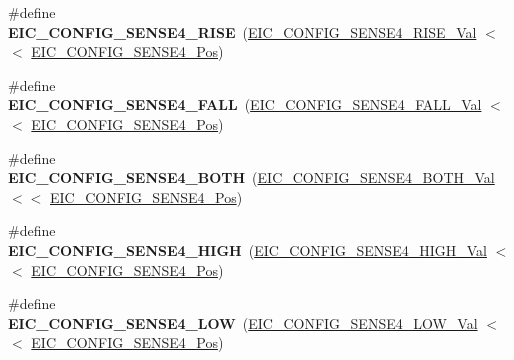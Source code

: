 \begin{DoxyCompactItemize}
\item 
\hypertarget{group___s_a_m_l21___e_i_c_ga3b5ae1a6631feb1f3dfd6a2c79d9be79}{}\#define {\bfseries E\+I\+C\+\_\+\+C\+O\+N\+F\+I\+G\+\_\+\+S\+E\+N\+S\+E4\+\_\+\+R\+I\+S\+E}~(\hyperlink{group___s_a_m_l21___e_i_c_gaad52f78c0fc34ba713282c4f2cb52965}{E\+I\+C\+\_\+\+C\+O\+N\+F\+I\+G\+\_\+\+S\+E\+N\+S\+E4\+\_\+\+R\+I\+S\+E\+\_\+\+Val}    $<$$<$ \hyperlink{group___s_a_m_l21___e_i_c_gad23c76b1fbf7d30fa3aa738a38c453c3}{E\+I\+C\+\_\+\+C\+O\+N\+F\+I\+G\+\_\+\+S\+E\+N\+S\+E4\+\_\+\+Pos})\label{group___s_a_m_l21___e_i_c_ga3b5ae1a6631feb1f3dfd6a2c79d9be79}

\item 
\hypertarget{group___s_a_m_l21___e_i_c_gaa4ecdea1d3d333051a1004aed81462de}{}\#define {\bfseries E\+I\+C\+\_\+\+C\+O\+N\+F\+I\+G\+\_\+\+S\+E\+N\+S\+E4\+\_\+\+F\+A\+L\+L}~(\hyperlink{group___s_a_m_l21___e_i_c_ga4fe8ad8e7d22ba42d070d9108213d907}{E\+I\+C\+\_\+\+C\+O\+N\+F\+I\+G\+\_\+\+S\+E\+N\+S\+E4\+\_\+\+F\+A\+L\+L\+\_\+\+Val}    $<$$<$ \hyperlink{group___s_a_m_l21___e_i_c_gad23c76b1fbf7d30fa3aa738a38c453c3}{E\+I\+C\+\_\+\+C\+O\+N\+F\+I\+G\+\_\+\+S\+E\+N\+S\+E4\+\_\+\+Pos})\label{group___s_a_m_l21___e_i_c_gaa4ecdea1d3d333051a1004aed81462de}

\item 
\hypertarget{group___s_a_m_l21___e_i_c_ga44e9df8a2cd69346f9f43c98ce9d9a12}{}\#define {\bfseries E\+I\+C\+\_\+\+C\+O\+N\+F\+I\+G\+\_\+\+S\+E\+N\+S\+E4\+\_\+\+B\+O\+T\+H}~(\hyperlink{group___s_a_m_l21___e_i_c_ga90038bdcd72cf77acd74f46032eb292c}{E\+I\+C\+\_\+\+C\+O\+N\+F\+I\+G\+\_\+\+S\+E\+N\+S\+E4\+\_\+\+B\+O\+T\+H\+\_\+\+Val}    $<$$<$ \hyperlink{group___s_a_m_l21___e_i_c_gad23c76b1fbf7d30fa3aa738a38c453c3}{E\+I\+C\+\_\+\+C\+O\+N\+F\+I\+G\+\_\+\+S\+E\+N\+S\+E4\+\_\+\+Pos})\label{group___s_a_m_l21___e_i_c_ga44e9df8a2cd69346f9f43c98ce9d9a12}

\item 
\hypertarget{group___s_a_m_l21___e_i_c_gaaefb9ad90ae4dc4e600aef617e6ecf1d}{}\#define {\bfseries E\+I\+C\+\_\+\+C\+O\+N\+F\+I\+G\+\_\+\+S\+E\+N\+S\+E4\+\_\+\+H\+I\+G\+H}~(\hyperlink{group___s_a_m_l21___e_i_c_gaf61da74ee963e779f81a0fa2f81e9c75}{E\+I\+C\+\_\+\+C\+O\+N\+F\+I\+G\+\_\+\+S\+E\+N\+S\+E4\+\_\+\+H\+I\+G\+H\+\_\+\+Val}    $<$$<$ \hyperlink{group___s_a_m_l21___e_i_c_gad23c76b1fbf7d30fa3aa738a38c453c3}{E\+I\+C\+\_\+\+C\+O\+N\+F\+I\+G\+\_\+\+S\+E\+N\+S\+E4\+\_\+\+Pos})\label{group___s_a_m_l21___e_i_c_gaaefb9ad90ae4dc4e600aef617e6ecf1d}

\item 
\hypertarget{group___s_a_m_l21___e_i_c_ga515a4fbaa282d5a49e1f322810888543}{}\#define {\bfseries E\+I\+C\+\_\+\+C\+O\+N\+F\+I\+G\+\_\+\+S\+E\+N\+S\+E4\+\_\+\+L\+O\+W}~(\hyperlink{group___s_a_m_l21___e_i_c_ga92370d05cd0d822893f57ecf0ff7a2a5}{E\+I\+C\+\_\+\+C\+O\+N\+F\+I\+G\+\_\+\+S\+E\+N\+S\+E4\+\_\+\+L\+O\+W\+\_\+\+Val}     $<$$<$ \hyperlink{group___s_a_m_l21___e_i_c_gad23c76b1fbf7d30fa3aa738a38c453c3}{E\+I\+C\+\_\+\+C\+O\+N\+F\+I\+G\+\_\+\+S\+E\+N\+S\+E4\+\_\+\+Pos})\label{group___s_a_m_l21___e_i_c_ga515a4fbaa282d5a49e1f322810888543}


\end{DoxyCompactItemize}

